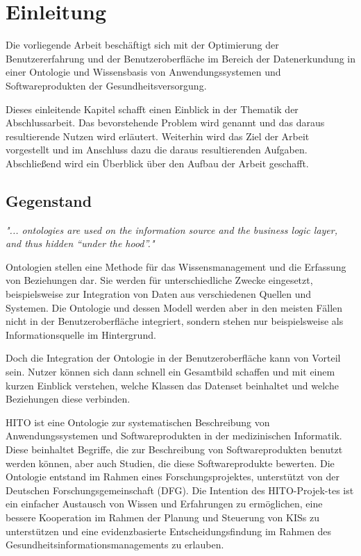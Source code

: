 \chapter{Einleitung}\label{ch:introduction}

Die vorliegende Arbeit beschäftigt sich mit der Optimierung der Benutzererfahrung und der Benutzeroberfläche im Bereich der Datenerkundung in einer Ontologie und Wissensbasis von Anwendungssystemen und Softwareprodukten der Gesundheitsversorgung.

Dieses einleitende Kapitel schafft einen Einblick in der Thematik der Abschlussarbeit. 
Das bevorstehende Problem wird genannt und das daraus resultierende Nutzen wird erläutert. 
Weiterhin wird das Ziel der Arbeit vorgestellt und im Anschluss dazu die daraus resultierenden Aufgaben. 
Abschließend wird ein Überblick über den Aufbau der Arbeit geschafft.

\section{Gegenstand}\label{sec:gegenstand}

\begin{center}
\textit{"... ontologies are used on the information source and the business logic layer, and thus hidden “under the hood”."}
\end{center}

\begin{flushright}
\textit{ \textendash{} \citep{paulheim2010ontology}} \newline
\end{flushright}

Ontologien stellen eine Methode für das Wissensmanagement und die Erfassung von Beziehungen dar.
Sie werden für unterschiedliche Zwecke eingesetzt, beispielsweise zur Integration von Daten aus verschiedenen Quellen und Systemen.
Die Ontologie und dessen Modell werden aber in den meisten Fällen nicht in der Benutzeroberfläche integriert, sondern stehen nur beispielsweise als Informationsquelle im Hintergrund. \citep[vgl.]{paulheim2010ontology}

Doch die Integration der Ontologie in der Benutzeroberfläche kann von Vorteil sein. 
Nutzer können sich dann schnell ein Gesamtbild schaffen und mit einem kurzen Einblick verstehen, welche Klassen das Datenset beinhaltet und welche Beziehungen diese verbinden. \citep[vgl.]{linkeddatavisualization}

\ac{HITO} ist eine Ontologie zur systematischen Beschreibung von Anwendungssystemen und Softwareprodukten in der medizinischen Informatik.
Diese beinhaltet Begriffe, die zur Beschreibung von Softwareprodukten benutzt werden können, aber auch Studien, die diese Softwareprodukte bewerten.
Die Ontologie entstand im Rahmen eines Forschungsprojektes, unterstützt von der Deutschen Forschungsgemeinschaft (\ac{DFG}).
Die Intention des HITO-Projek-tes ist ein einfacher Austausch von Wissen und Erfahrungen zu ermöglichen, eine bessere Kooperation im Rahmen der Planung und Steuerung von \acp{KIS} zu unterstützen und eine evidenzbasierte Entscheidungsfindung im Rahmen des Gesundheitsinformationsmanagements zu erlauben.

